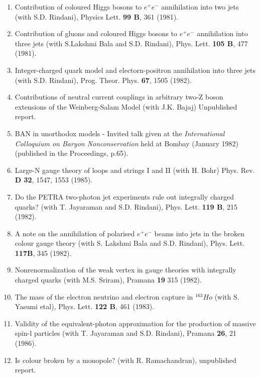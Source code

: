 \begin{enumerate}
\item Contribution of coloured Higgs bosons to $e^+ e^-$ annihilation
into two jets (with S.D. Rindani), Physics Lett. {\bf 99 B}, 361 (1981).

\item Contribution of gluons and coloured Higgs bosons to $e^+ e^-$
annihilation into three jets (with S.Lakshmi Bala and S.D. Rindani),
Phys. Lett. {\bf 105 B}, 477 (1981).

\item Integer-charged quark model and electorn-positron annihilation
into three jets (with S.D. Rindani), Prog. Theor. Phys. {\bf 67}, 1505 (1982).

\item Contributions of neutral current couplings in arbitrary two-Z
boson extensions of the Weinberg-Salam Model (with J.K. Bajaj)
Unpublished report.

\item BAN in unorthodox models - Invited talk given at the {\it International
Colloquium on Baryon Nonconservation} held at Bombay (January 1982)
(published in the Proceedings, p.65).

\item Large-N gauge theory of loops and strings I and II (with H. Bohr)
Phys. Rev. {\bf D 32}, 1547, 1553 (1985).

\item Do the PETRA two-photon jet experiments rule out integrally
charged quarks?  (with T. Jayaraman and S.D. Rindani), Phys. Lett. {\bf
119 B}, 215 (1982).

\item A note on the annihilation of polarised $e^+ e^-$ beams into jets
in the broken colour gauge theory (with S. Lakshmi Bala and S.D.
Rindani), Phys. Lett. {\bf 117B}, 345 (1982).

\item Nonrenormalization of the weak vertex in gauge theories with
integrally charged quarks (with M.S. Sriram), Pramana {\bf 19} 315
(1982). 

\item The mass of the electron neutrino and electron capture in
$^{163}Ho$ (with S. Yasumi etal), Phys. Lett. {\bf 122 B}, 461 (1983).

\item Validity of the equivalent-photon approximation for the production
of massive spin-l particles (with T. Jayaraman and S.D. Rindani), Pramana
{\bf 26}, 21 (1986).

\item Is colour broken by a monopole? (with R. Ramachandran),
unpublished report.


\end{enumerate}

